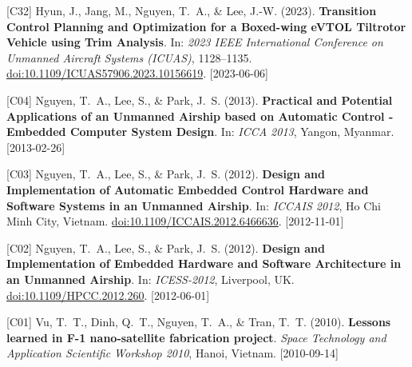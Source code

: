 {\begin{pubenumerate}
\item {\color{green}[C32]} Hyun, J., Jang, M., Nguyen, T.\ A., \& Lee, J.-W. (2023). \textbf{Transition Control Planning and Optimization for a Boxed-wing eVTOL Tiltrotor Vehicle using Trim Analysis}. In: \textit{2023 IEEE International Conference on Unmanned Aircraft Systems (ICUAS)}, 1128--1135. \href{https://doi.org/10.1109/ICUAS57906.2023.10156619}{doi:10.1109/ICUAS57906.2023.10156619}. [2023-06-06]

\item {\color{green}[C04]} Nguyen, T.\ A., Lee, S., \& Park, J.\ S. (2013). \textbf{Practical and Potential Applications of an Unmanned Airship based on Automatic Control - Embedded Computer System Design}. In: \textit{ICCA 2013}, Yangon, Myanmar. [2013-02-26]

\item {\color{green}[C03]} Nguyen, T.\ A., Lee, S., \& Park, J.\ S. (2012). \textbf{Design and Implementation of Automatic Embedded Control Hardware and Software Systems in an Unmanned Airship}. In: \textit{ICCAIS 2012}, Ho Chi Minh City, Vietnam. \href{https://doi.org/10.1109/ICCAIS.2012.6466636}{doi:10.1109/ICCAIS.2012.6466636}. [2012-11-01]

\item {\color{green}[C02]} Nguyen, T.\ A., Lee, S., \& Park, J.\ S. (2012). \textbf{Design and Implementation of Embedded Hardware and Software Architecture in an Unmanned Airship}. In: \textit{ICESS-2012}, Liverpool, UK. \href{https://doi.org/10.1109/HPCC.2012.260}{doi:10.1109/HPCC.2012.260}. [2012-06-01]

\item {\color{green}[C01]} Vu, T.\ T., Dinh, Q.\ T., Nguyen, T.\ A., \& Tran, T.\ T. (2010). \textbf{Lessons learned in F-1 nano-satellite fabrication project}. \textit{Space Technology and Application Scientific Workshop 2010}, Hanoi, Vietnam. [2010-09-14]

\end{pubenumerate}
}

